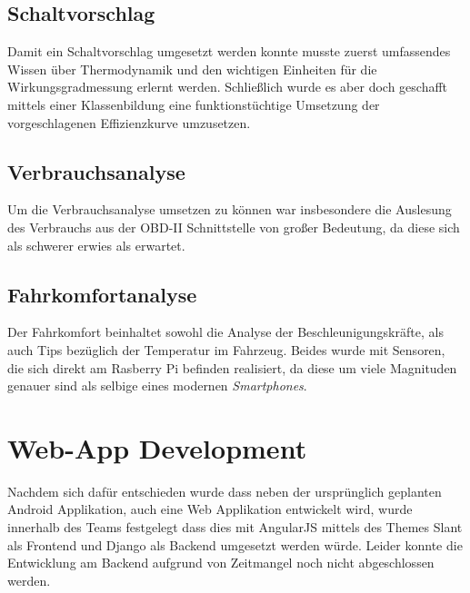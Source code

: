 \subsection{Schaltvorschlag}
Damit ein Schaltvorschlag umgesetzt werden konnte musste zuerst umfassendes Wissen über Thermodynamik und den wichtigen Einheiten für die Wirkungsgradmessung erlernt werden. Schließlich wurde es aber doch geschafft mittels einer Klassenbildung eine funktionstüchtige Umsetzung der vorgeschlagenen Effizienzkurve umzusetzen.
\subsection{Verbrauchsanalyse}
Um die Verbrauchsanalyse umsetzen zu können war insbesondere die Auslesung des Verbrauchs aus der OBD-II Schnittstelle von großer Bedeutung, da diese sich als schwerer erwies als erwartet.
\subsection{Fahrkomfortanalyse}
Der Fahrkomfort beinhaltet sowohl die Analyse der Beschleunigungskräfte, als auch Tips bezüglich der Temperatur im Fahrzeug. Beides wurde mit Sensoren, die sich direkt am Rasberry Pi befinden realisiert, da diese um viele Magnituden genauer sind als selbige eines modernen \textit{Smartphones}.
\section{Web-App Development}
Nachdem sich dafür entschieden wurde dass neben der ursprünglich geplanten Android Applikation, auch eine Web Applikation entwickelt wird, wurde innerhalb des Teams festgelegt dass dies mit AngularJS mittels des Themes Slant als Frontend  und Django als Backend umgesetzt werden würde. Leider konnte die Entwicklung am Backend aufgrund von Zeitmangel noch nicht abgeschlossen werden.